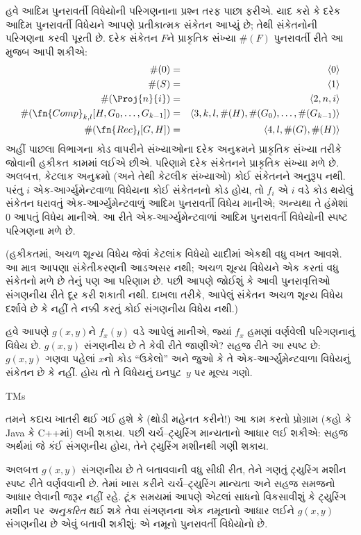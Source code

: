 \documentclass[../../../include/open-logic-section]{subfiles}
\begin{document}
હવે આદિમ પુનરાવર્તી વિધેયોની પરિગણનાના પ્રશ્ન તરફ પાછા ફરીએ.
યાદ કરો કે દરેક આદિમ પુનરાવર્તી વિધેયને આપણે પ્રતીકાત્મક
સંકેતન આપ્યું છે; તેથી સંકેતનોની પરિગણના કરવી પૂરતી છે. દરેક
સંકેતન $F$ને પ્રાકૃતિક સંખ્યા $\#(F)$ પુનરાવર્તી રીતે આ મુજબ
આપી શકીએ:
\begin{eqnarray*}
\#(0) & = & \langle 0 \rangle \\
\#(S) & = & \langle 1 \rangle \\
\#(\Proj{n}{i}) & = & \langle 2, n, i \rangle \\
\#(\fn{Comp}_{k,l}[H,G_0,\dots,G_{k-1}]) & = & \langle
3,k,l,\#(H),\#(G_0),\dots,\#(G_{k-1}) \rangle \\
\#(\fn{Rec}_l[G,H]) & = & \langle 4, l, \#(G), \#(H) \rangle
\end{eqnarray*}
અહીં પાછલા વિભાગના કોડ વાપરીને સંખ્યાઓના દરેક અનુક્રમને પ્રાકૃતિક
સંખ્યા તરીકે જોવાની હકીકત કામમાં લઈએ છીએ. પરિણામે દરેક સંકેતનને
પ્રાકૃતિક સંખ્યા મળે છે. અલબત્ત, કેટલાક અનુક્રમો (અને તેથી કેટલીક
સંખ્યાઓ) કોઈ સંકેતનને અનુરૂપ નથી. પરંતુ $i$ એક-આર્ગ્યુમેન્ટવાળા
વિધેયના કોઈ સંકેતનનો કોડ
હોય, તો $f_i$ એ $i$ વડે કોડ થયેલું સંકેતન ધરાવતું એક-આર્ગ્યુમેન્ટવાળું આદિમ
પુનરાવર્તી વિધેય માનીએ; અન્યથા તે હંમેશાં $0$ આપતું વિધેય માનીએ.
આ રીતે એક-આર્ગ્યુમેન્ટવાળાં આદિમ પુનરાવર્તી વિધેયોની સ્પષ્ટ
પરિગણના મળે છે.

(હકીકતમાં, અચળ શૂન્ય વિધેય જેવાં કેટલાંક વિધેયો યાદીમાં એકથી વધુ
વખત આવશે. આ માત્ર આપણા સંકેતીકરણની આડઅસર નથી; અચળ શૂન્ય
વિધેયને એક કરતાં વધુ સંકેતનો મળે છે તેનું પણ આ પરિણામ છે.
પછી આપણે જોઈશું કે આવી પુનરાવૃત્તિઓ સંગણનીય રીતે દૂર કરી શકાતી
નથી. દાખલા તરીકે, આપેલું સંકેતન અચળ શૂન્ય વિધેય દર્શાવે છે કે
નહીં તે નક્કી કરતું કોઈ સંગણનીય વિધેય નથી.)

હવે આપણે $g(x,y)$ને $f_x(y)$ વડે આપેલું માનીએ, જ્યાં $f_x$ હમણાં
વર્ણવેલી પરિગણનાનું વિધેય છે. $g(x,y)$ સંગણનીય છે તે કેવી રીતે
જાણીએ? સહજ રીતે આ સ્પષ્ટ છે: $g(x,y)$ ગણવા પહેલાં $x$નો કોડ
``ઉકેલો'' અને જુઓ કે તે એક-આર્ગ્યુમેન્ટવાળા વિધેયનું સંકેતન છે
કે નહીં. હોય તો તે વિધેયનું ઇનપુટ~$y$ પર મૂલ્ય ગણો.

\begin{tagblock}{TMs}
\begin{digress}
તમને કદાચ ખાતરી થઈ ગઈ હશે કે (થોડી મહેનત કરીને!) આ કામ કરતો
પ્રોગ્રામ (કહો કે Java કે C++માં) લખી શકાય. પછી ચર્ચ--ટ્યુરિંગ
માન્યતાનો આધાર લઈ શકીએ: સહજ અર્થમાં જે કંઈ સંગણનીય હોય, તેને
ટ્યુરિંગ મશીનથી ગણી શકાય.

અલબત્ત $g(x,y)$ સંગણનીય છે તે બતાવવાની વધુ સીધી રીત, તેને ગણતું
ટ્યુરિંગ મશીન સ્પષ્ટ રીતે વર્ણવવાની છે. તેમાં ખાસ કરીને
ચર્ચ--ટ્યુરિંગ માન્યતા અને સહજ સમજનો આધાર લેવાની જરૂર નહીં રહે.
ટૂંક સમયમાં આપણે એટલાં સાધનો વિકસાવીશું કે ટ્યુરિંગ મશીન પર
\emph{અનુકરિત} થઈ શકે તેવા સંગણનના એક નમૂનાનો આધાર લઈને
$g(x,y)$ સંગણનીય છે એવું બતાવી શકીશું: એ નમૂનો પુનરાવર્તી
વિધેયોનો છે.
\end{digress}
\end{tagblock}
\end{document}
